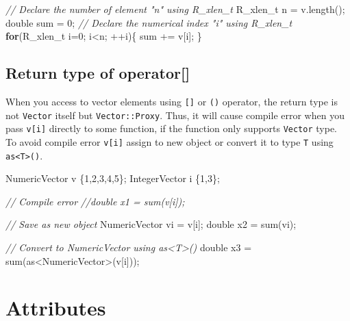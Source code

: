\documentclass[]{book}
\newenvironment{Shaded}{\begin{snugshade}}{\end{snugshade}}
\newcommand{\DataTypeTok}[1]{\textcolor[rgb]{0.13,0.29,0.53}{#1}}
\newcommand{\DecValTok}[1]{\textcolor[rgb]{0.00,0.00,0.81}{#1}}
\newcommand{\CommentTok}[1]{\textcolor[rgb]{0.56,0.35,0.01}{\textit{#1}}}
\newcommand{\ControlFlowTok}[1]{\textcolor[rgb]{0.13,0.29,0.53}{\textbf{#1}}}
\newcommand{\NormalTok}[1]{#1}
\theoremstyle{definition}
\theoremstyle{definition}
\theoremstyle{remark}
\begin{document}
\begin{Shaded}
\begin{Highlighting}[]
\CommentTok{// Declare the number of element "n" using R_xlen_t}
\DataTypeTok{R_xlen_t}\NormalTok{ n = v.length();}
\DataTypeTok{double}\NormalTok{ sum = }\DecValTok{0}\NormalTok{;}
\CommentTok{// Declare the numerical index "i" using R_xlen_t}
\ControlFlowTok{for}\NormalTok{(}\DataTypeTok{R_xlen_t}\NormalTok{ i=}\DecValTok{0}\NormalTok{; i<n; ++i)\{}
\NormalTok{  sum += v[i];}
\NormalTok{\}}
\end{Highlighting}
\end{Shaded}

\section{Return type of operator{[}{]}}\label{return-type-of-operator}

When you access to vector elements using \texttt{{[}{]}} or \texttt{()}
operator, the return type is not \texttt{Vector} itself but
\texttt{Vector::Proxy}. Thus, it will cause compile error when you pass
\texttt{v{[}i{]}} directly to some function, if the function only
supports \texttt{Vector} type. To avoid compile error \texttt{v{[}i{]}}
assign to new object or convert it to type \texttt{T} using
\texttt{as\textless{}T\textgreater{}()}.

\begin{Shaded}
\begin{Highlighting}[]
\NormalTok{NumericVector v \{}\DecValTok{1}\NormalTok{,}\DecValTok{2}\NormalTok{,}\DecValTok{3}\NormalTok{,}\DecValTok{4}\NormalTok{,}\DecValTok{5}\NormalTok{\};}
\NormalTok{IntegerVector i \{}\DecValTok{1}\NormalTok{,}\DecValTok{3}\NormalTok{\};}

\CommentTok{// Compile error}
\CommentTok{//double x1 = sum(v[i]);}

\CommentTok{// Save as new object}
\NormalTok{NumericVector vi = v[i];}
\DataTypeTok{double}\NormalTok{   x2 = sum(vi);}

\CommentTok{// Convert to NumericVector using as<T>()}
\DataTypeTok{double}\NormalTok{   x3 = sum(as<NumericVector>(v[i]));}
\end{Highlighting}
\end{Shaded}

\chapter{Attributes}\label{attributes}
\end{document}
